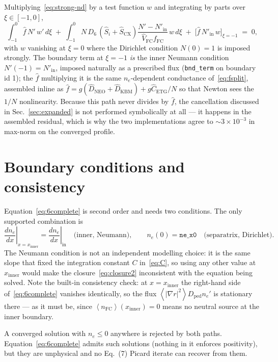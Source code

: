 \documentclass[11pt]{article}
\renewcommand{\ne}{n_{e}}  %
\newcommand{\nfc}{n_{\mathrm{FC}}}
\newcommand{\Dped}{D_{\mathrm{ped}}}
\newcommand{\fFC}{f_{\mathrm{FC}}}
\newcommand{\fsa}[1]{\left\langle #1 \right\rangle}
\newcommand{\gradrsq}{\fsa{|\nabla r|^{2}}}
\newcommand{\dnein}{\left.\frac{d\ne}{dx}\right|_{\mathrm{in}}}
\newcommand{\xin}{x_{\mathrm{inner}}}
\begin{document}
Multiplying~\eqref{eq:strong-nd} by a test function $w$ and integrating by
parts over $\xi\in[-1,0]$,
\begin{equation}
  \int_{-1}^{0}\hat f\,N'\,w'\,d\xi
  \;+\; \int_{-1}^{0} N\,D_{6}\,(\hat S_{i}+\hat S_{\mathrm{CX}})
        \frac{N'-N'_{\mathrm{in}}}{\hat V_{\mathrm{FC}}\fFC}\,w\,d\xi
  \;+\; \bigl[\hat f\,N'_{\mathrm{in}}\,w\bigr]_{\xi=-1}
  \;=\; 0,
\end{equation}
with $w$ vanishing at $\xi=0$ where the Dirichlet condition $N(0)=1$ is
imposed strongly.  The boundary term at $\xi=-1$ \emph{is} the inner
Neumann condition $N'(-1)=N'_{\mathrm{in}}$, imposed naturally as a
prescribed flux (\texttt{bnd\_term} on boundary id 1); the $\hat f$
multiplying it is the same $\ne$-dependent conductance
of~\eqref{eq:fsplit}, assembled inline as
$\hat f = g(\hat D_{\mathrm{NEO}}+\hat D_{\mathrm{KBM}}) + g\hat
C_{\mathrm{ETG}}/N$ so that Newton sees the $1/N$ nonlinearity.
Because this path never divides by $\hat f$, the cancellation discussed in
Sec.~\ref{sec:expanded} is not performed symbolically at all --- it happens
in the assembled residual, which is why the two implementations agree to
$\sim\!3\times10^{-3}$ in max-norm on the converged profile.

\section{Boundary conditions and consistency}
\label{sec:bcs}

Equation~\eqref{eq:6complete} is second order and needs two conditions.
The only supported combination is
\begin{equation}
  \left.\frac{d\ne}{dx}\right|_{x=\xin} = \dnein
  \quad\text{(inner, Neumann)},
  \qquad
  \ne(0) = \texttt{ne\_x0}
  \quad\text{(separatrix, Dirichlet)}.
\end{equation}
The Neumann condition is not an independent modelling choice: it is the
same slope that fixed the integration constant $C$ in~\eqref{eq:C}, so
using any other value at $\xin$ would make the closure~\eqref{eq:closure2}
inconsistent with the equation being solved.  Note the built-in
consistency check: at $x=\xin$ the right-hand side
of~\eqref{eq:6complete} vanishes identically, so the flux
$\gradrsq\Dped\ne'$ is stationary there --- as it must be, since
$\fsa{\nfc}(\xin)=0$ means no neutral source at the inner boundary.

A converged solution with $\ne\le0$ anywhere is rejected by both paths.
Equation~\eqref{eq:6complete} admits such solutions (nothing in it enforces
positivity), but they are unphysical and no Eq.~(7) Picard iterate can
recover from them.
\end{document}
